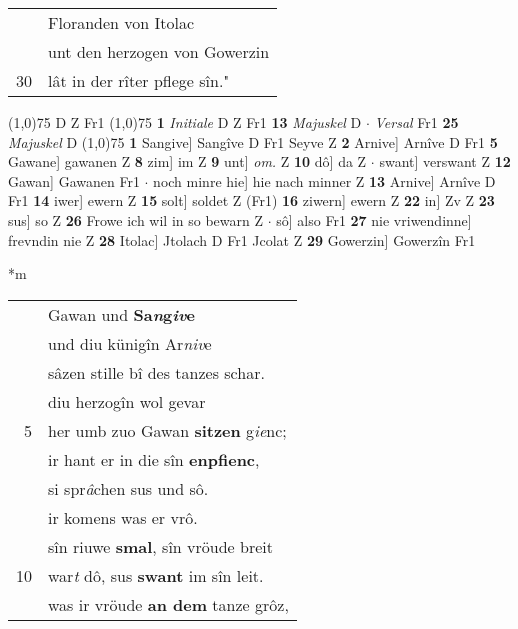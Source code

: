\documentclass[8pt,a4paper,notitlepage]{article}
\begin{document}
\begin{table}[ht]
\begin{minipage}[t]{0.5\linewidth}
\begin{tabular}{rl}
 & Floranden von Itolac\\ 
 & unt den herzogen von Gowerzin\\ 
30 & lât in der rîter pflege sîn."\\ 
\end{tabular}
\scriptsize
\line(1,0){75} \newline
D Z Fr1 \newline
\line(1,0){75} \newline
\textbf{1} \textit{Initiale} D Z Fr1  \textbf{13} \textit{Majuskel} D   $\cdot$ \textit{Versal} Fr1  \textbf{25} \textit{Majuskel} D  \newline
\line(1,0){75} \newline
\textbf{1} Sangive] Sangîve D Fr1 Seyve Z \textbf{2} Arnive] Arnîve D Fr1 \textbf{5} Gawane] gawanen Z \textbf{8} zim] im Z \textbf{9} unt] \textit{om.} Z \textbf{10} dô] da Z  $\cdot$ swant] verswant Z \textbf{12} Gawan] Gawanen Fr1  $\cdot$ noch minre hie] hie nach minner Z \textbf{13} Arnive] Arnîve D Fr1 \textbf{14} iwer] ewern Z \textbf{15} solt] soldet Z (Fr1) \textbf{16} ziwern] ewern Z \textbf{22} in] Zv Z \textbf{23} sus] so Z \textbf{26} Frowe ich wil in so bewarn Z  $\cdot$ sô] also Fr1 \textbf{27} nie vriwendinne] frevndin nie Z \textbf{28} Itolac] Jtolach D Fr1 Jcolat Z \textbf{29} Gowerzin] Gowerzîn Fr1 \newline
\end{minipage}
\hspace{0.5cm}
\begin{minipage}[t]{0.5\linewidth}
\small
\begin{center}*m
\end{center}
\begin{tabular}{rl}
 & Gawan und \textbf{Sa\textit{n}g\textit{iv}e}\\ 
 & und diu künigîn Ar\textit{niv}e\\ 
 & sâzen stille bî des tanzes schar.\\ 
 & diu herzogîn wol gevar\\ 
5 & her umb zuo Gawan \textbf{sitzen} g\textit{ie}nc;\\ 
 & ir hant er in die sîn \textbf{enpfienc},\\ 
 & si spr\textit{â}chen sus und sô.\\ 
 & ir komens was er vrô.\\ 
 & sîn riuwe \textbf{smal}, sîn vröude breit\\ 
10 & war\textit{t} dô, sus \textbf{swant} im sîn leit.\\ 
 & was ir vröude \textbf{an dem} tanze grôz,\\ 

\end{tabular}
\end{minipage}
\end{table}
\end{document}

